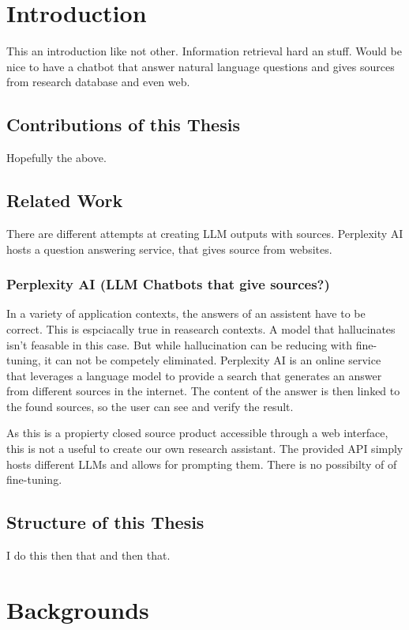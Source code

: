 \documentclass[english, version-2022-01]{uzl-thesis}
\begin{document}
\chapter{Introduction}

This an introduction like not other. Information retrieval hard an stuff. Would be nice to have a chatbot that answer natural language questions and gives sources from research database and even web.

\section{Contributions of this Thesis}

Hopefully the above.

\section{Related Work}

There are different attempts at creating LLM outputs with sources. Perplexity AI hosts a question answering service, that gives source from websites.

\subsection{Perplexity AI (LLM Chatbots that give sources?)}

In a variety of application contexts, the answers of an assistent have to be correct. This is espciacally true in reasearch contexts. A model that hallucinates isn't feasable in this case. But while hallucination can be reducing with fine-tuning, it can not be competely eliminated. Perplexity AI is an online service that leverages a language model to provide a search that generates an answer from different sources in the internet. The content of the answer is then linked to the found sources, so the user can see and verify the result.

As this is a propierty closed source product accessible through a web interface, this is not a useful to create our own research assistant. The provided API simply hosts different LLMs and allows for prompting them. There is no possibilty of of fine-tuning.

\section{Structure of this Thesis}
I do this then that and then that.

\chapter{Backgrounds}
\end{document}
